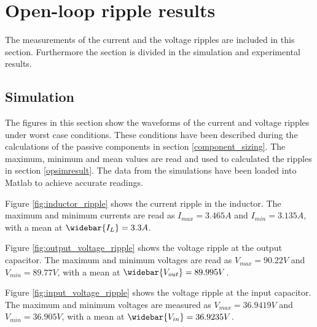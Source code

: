 
\chapter{Open-loop ripple results}
\vspace{-1cm}
The measurements of the current and the voltage ripples are included in this section. Furthermore the section is divided in the simulation and experimental results.
 \label{app:OL_ripple}
 
\section{Simulation}
The figures in this section show the waveforms of the current and voltage ripples under worst case conditions. These conditions have been described during the calculations of the passive components in section \ref{component_sizing}. The maximum, minimum and mean values are read and used to calculated the ripples in section \ref{opsimresult}. The data from the simulations have been loaded into Matlab to achieve accurate readings.

Figure \ref{fig:inductor_ripple} shows the current ripple in the inductor. The maximum and minimum currents are read as $I_{max} = 3.465A$ and $I_{min} = 3.135A$, with a mean at $\widebar{I_L} = 3.3A$.

Figure \ref{fig:output_voltage_ripple} shows the voltage ripple at the output capacitor. The maximum and minimum voltages are read as $V_{max} = 90.22V$ and $V_{min} = 89.77V$, with a mean at $\widebar{V_{out}} = 89.995V$.

Figure \ref{fig:input_voltage_ripple} shows the voltage ripple at the input capacitor. The maximum and minimum voltages are measured as $V_{max} = 36.9419V$ and $V_{min} = 36.905V$, with a mean at $\widebar{V_{in}} = 36.9235V$.


